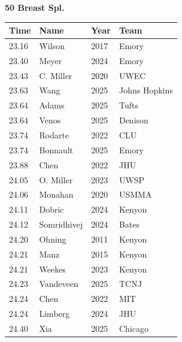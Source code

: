 \noindent\begin{minipage}[t]{0.98\textwidth}
\centering
\textbf{\textcolor{teamprimary}{50 Breast Spl.}}\par
\vspace{0.5em}
\centering
\small
\renewcommand{\arraystretch}{1.0}
\setlength{\tabcolsep}{4pt}
\begin{tabular}{@{}p{2.5cm}p{4.5cm}p{1.5cm}p{2.5cm}@{}}
\toprule
\textbf{Time} & \textbf{Name} & \textbf{Year} & \textbf{Team} \\
\midrule
23.16 & Wilson & 2017 & Emory \\
23.40 & Meyer & 2024 & Emory \\
23.43 & C. Miller & 2020 & UWEC \\
23.63 & Wang & 2025 & Johns Hopkins \\
23.64 & Adams & 2025 & Tufts \\
23.64 & Venos & 2025 & Denison \\
23.74 & Rodarte & 2022 & CLU \\
23.74 & Bonnault & 2025 & Emory \\
23.88 & Chen & 2022 & JHU \\
24.05 & O. Miller & 2023 & UWSP \\
24.06 & Monahan & 2020 & USMMA \\
24.11 & Dobric & 2024 & Kenyon \\
24.12 & Somridhivej & 2024 & Bates \\
24.20 & Ohning & 2011 & Kenyon \\
24.21 & Manz & 2015 & Kenyon \\
24.21 & Weekes & 2023 & Kenyon \\
24.23 & Vandeveen & 2025 & TCNJ \\
24.24 & Chen & 2022 & MIT \\
24.24 & Limberg & 2024 & JHU \\
24.40 & Xia & 2025 & Chicago \\
\bottomrule
\end{tabular}
\end{minipage}
\vspace{1.2em}

